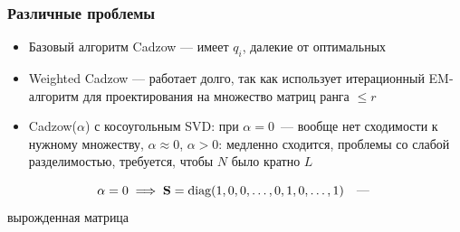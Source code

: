 \documentclass[unicode, notheorems]{beamer}
\begin{document}
\begin{frame}
    \frametitle{Различные проблемы}
    \begin{itemize}
    \item Базовый алгоритм Cadzow --- имеет $q_i$, далекие от оптимальных
    \item Weighted Cadzow --- работает долго, так как использует итерационный EM-алгоритм для проектирования на множество матриц ранга $\le r$
    \item Cadzow($\alpha$) с косоугольным SVD: при $\alpha = 0$~--- вообще нет сходимости к нужному множеству, $\alpha \approx 0$, $\alpha > 0$: медленно сходится, проблемы со слабой разделимостью, требуется, чтобы $N$ было кратно $L$
    \end{itemize}
    \begin{equation*}
    \alpha = 0 \implies \mathbf{S} = \text{diag}(1, 0, 0, \ldots, 0, 1, 0, \ldots, 1) \quad \text{--- }
    \end{equation*}
    вырожденная матрица
\end{frame}


\end{document}
